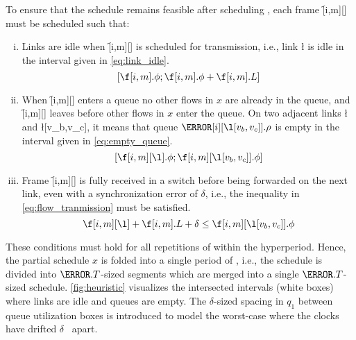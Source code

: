 To ensure that the schedule remains feasible after scheduling \s{}, each frame \f[i,m][] must be scheduled such that:
\begin{enumerate}[(i)]
   \item Links are idle when \f[i,m][] is scheduled for transmission, i.e., link \l{} is idle in the interval given in \autoref{eq:link_idle}. 
   \begin{equation} \label{eq:link_idle}
   \left[\f[i,m].\phi; \f[i,m].\phi + \f[i,m].L\right]
   \end{equation} \label{item:link_congestion}
   \vspace{-0.2cm}
   
   \item When \f[i,m][] enters a queue no other flows in $x$ are already in the queue, and \f[i,m][] leaves before other flows in $x$ enter the queue. On two adjacent links \l{} and \l[v_b,v_c], it means that queue $\s[i][{\l[v_b,v_c]}].\rho$ is empty in the interval given in \autoref{eq:empty_queue}.
   \begin{equation} \label{eq:empty_queue}
      \left[\f[i,m][\l].\phi; \f[i,m][{\l[v_b,v_c]}].\phi \right]
   \end{equation} \label{item:deterministic_queues}
   \vspace{-0.2cm}
   
   \item Frame \f[i,m][] is fully received in a switch before being forwarded on the next link, even with a synchronization error of $\delta$, i.e., the inequality in \autoref{eq:flow_tranmission} must be satisfied.
   \begin{equation} \label{eq:flow_tranmission}
      \f[i,m][\l] + \f[i,m].L + \delta \leq \f[i,m][{\l[v_b,v_c]}].\phi
   \end{equation} \label{item:flow_transmission}
   \vspace{-0.2cm}
   
\end{enumerate}
These conditions must hold for all repetitions of \s{} within the hyperperiod. Hence, the partial schedule $x$ is folded into a single period of \s{}, i.e., the schedule is divided into $\s{}.T$-sized segments which are merged into a single $\s{}.T$-sized schedule.
\autoref{fig:heuristic} visualizes the intersected intervals (white boxes) where links are idle and queues are empty. The $\delta$-sized spacing in $q_1$ between queue utilization boxes is introduced to model the worst-case where the clocks have drifted $\delta$~\mus{} apart. 

